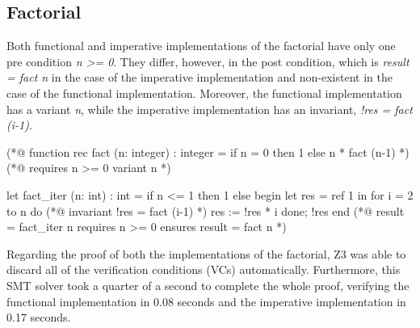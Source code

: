 \subsection{Factorial}
\label{sub:factorial}

Both functional and imperative implementations of the factorial have only one pre condition \emph{n >= 0}.
They differ, however, in the post condition, which is \emph{result = fact n} in the case of the imperative implementation and non-existent in the case of the functional implementation.
Moreover, the functional implementation has a variant \emph{n}, while the imperative implementation has an invariant, \emph{!res = fact (i-1)}. 

\bigskip
\newcommand{\provername}[1]{\cellcolor{yellow!25}
\begin{sideways}\textbf{#1}~~\end{sideways}}
\newcommand{\explanation}[1]{\cellcolor{yellow!13}lemma \texttt{#1}}
\newcommand{\transformation}[1]{\cellcolor{yellow!13}transformation \texttt{#1}}
\newcommand{\subgoal}[2]{\cellcolor{yellow!13}subgoal #2}
\newcommand{\valid}[1]{\cellcolor{green!13}#1}
\newcommand{\unknown}[1]{\cellcolor{red!20}#1}
\newcommand{\invalid}[1]{\cellcolor{red!50}#1}
\newcommand{\timeout}[1]{\cellcolor{red!20}(#1)}
\newcommand{\outofmemory}[1]{\cellcolor{red!20}(#1)}
\newcommand{\noresult}{\multicolumn{1}{>{\columncolor[gray]{0.8}}c|}{~}}
\newcommand{\highfailure}{\cellcolor{red!50}FAILURE}
    
\begin{minipage}{\linewidth}
\begin{gospel}
  (*@ function rec fact (n: integer) : integer =
  if n = 0 then 1 else n * fact (n-1) *)
  (*@ requires n >= 0 
    variant n *)
\end{gospel}
\end{minipage}

\begin{minipage}{\linewidth}
\begin{ocamlenv}
  let fact_iter (n: int) : int =
    if n <= 1 then 1
    else
      begin 
        let res = ref 1 in
        for i = 2 to n do
          (*@ invariant !res = fact (i-1) *)
          res := !res * i
        done;
        !res
      end
  (*@ result = fact_iter n
    requires n >= 0 
    ensures result = fact n *)
\end{ocamlenv}
\end{minipage}

Regarding the proof of both the implementations of the factorial, Z3 was able to discard all of the verification conditions (VCs) automatically.
Furthermore, this SMT solver took a quarter of a second to complete the whole proof, verifying the functional implementation in 0.08 seconds and the imperative implementation in 0.17 seconds.

